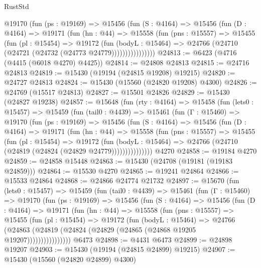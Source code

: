 \begin{lexlean}{RustStd}
\begin{coremodule}
            @19170
              (fun (ps : @19169) =>
              @15456
                (fun (S : @4164) =>
                @15456
                  (fun (D : @4164) =>
                  @19171
                    (fun (hn : @44) =>
                    @15558
                      (fun (pns : @15557) =>
                      @15455
                        (fun (pl : @15454) =>
                        @19172
                          (fun (bodyL : @15464) =>
                          @24766 (@24710 (@24721 (@24732 (@24773 @24779))))))))))))))))
@24813 := @6423 (@4716 (@4415 (@6018 @4270) @4425))
@24814 := @24808 @24813
@24815 := @24716 @24813
@24819 := @15430 (@19194 (@24815 @19208) @19215)
@24820 := @24727 @24813
@24824 := @15430 (@15560 (@24820 @19208) @4300)
@24826 := @24769 (@15517 @24813)
@24827 := @15501 @24826
@24829 := @15430 (@24827 @19238)
@24857 := @15648
    (fun (rty : @4164) =>
    @15458
      (fun (lets0 : @15457) =>
      @15459
        (fun (tail0 : @4439) =>
        @15461
          (fun (Γ : @15460) =>
          @19170
            (fun (ps : @19169) =>
            @15456
              (fun (S : @4164) =>
              @15456
                (fun (D : @4164) =>
                @19171
                  (fun (hn : @44) =>
                  @15558
                    (fun (pns : @15557) =>
                    @15455
                      (fun (pl : @15454) =>
                      @19172
                        (fun (bodyL : @15464) =>
                        @24766 (@24710 (@24819 (@24824 (@24829 @24779)))))))))))))))
    @4270
@24858 := @19184 @4270
@24859 := @24858 @15448
@24863 := @15430 (@24708 (@19181 (@19183 @24859)))
@24864 := @15530 @4270
@24865 := @19241 @24864
@24866 := @15533 @24864
@24868 := @24866 @24774 @21732
@24897 := @15670
    (fun (lets0 : @15457) =>
    @15459
      (fun (tail0 : @4439) =>
      @15461
        (fun (Γ : @15460) =>
        @19170
          (fun (ps : @19169) =>
          @15456
            (fun (S : @4164) =>
            @15456
              (fun (D : @4164) =>
              @19171
                (fun (hn : @44) =>
                @15558
                  (fun (pns : @15557) =>
                  @15455
                    (fun (pl : @15454) =>
                    @19172
                      (fun (bodyL : @15464) =>
                      @24766
                        (@24863
                          (@24819 (@24824 (@24829 (@24865 (@24868 @19205 @19207))))))))))))))))
    @6473
@24898 := @4431 @6473
@24899 := @24898 @19207
@24903 := @15430 (@19194 (@24815 @24899) @19215)
@24907 := @15430 (@15560 (@24820 @24899) @4300)

\end{coremodule}
\end{lexlean}

